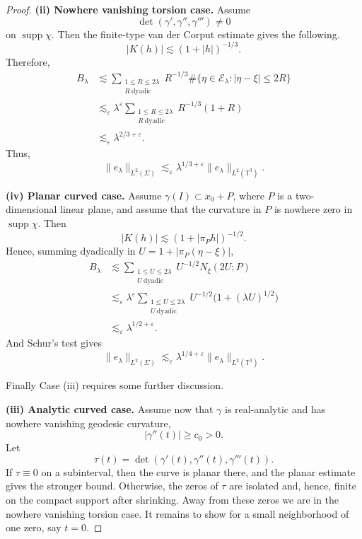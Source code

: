 \documentclass[11pt,reqno]{amsart}
\numberwithin{equation}{section}
\newcommand{\1}{\textbf{1}}
\begin{document}
\begin{proof}
		\noindent\textbf{(ii) Nowhere vanishing torsion case.}
		Assume
		\[
		\det(\gamma',\gamma'',\gamma''')\neq 0
		\]
		on \(\operatorname{supp}\chi\). Then the finite-type van der Corput estimate gives the following.
		\[
		|K(h)|\lesssim (1+|h|)^{-1/3}.
		\]
		Therefore,
		\[
		\begin{aligned}
			B_\lambda
			&\lesssim
			\sum_{\substack{1\le R\le 2\lambda\\ R\ \mathrm{dyadic}}}
			R^{-1/3}\#\{\eta\in\mathcal E_\lambda:|\eta-\xi|\le 2R\}  \\
			&\lesssim_\varepsilon
			\lambda^\varepsilon
			\sum_{\substack{1\le R\le 2\lambda\\ R\ \mathrm{dyadic}}}
			R^{-1/3}(1+R)                                             \\
			&\lesssim_\varepsilon \lambda^{2/3+\varepsilon}.
		\end{aligned}
		\]
		Thus,
		\[
		\|e_\lambda\|_{L^2(\Sigma)}
		\lesssim_\varepsilon
		\lambda^{1/3+\varepsilon}
		\|e_\lambda\|_{L^2(\mathbb T^3)} .
		\]
		
		\noindent\textbf{(iv) Planar curved case.}
		Assume \(\gamma(I)\subset x_0+P\), where \(P\) is a two-dimensional linear
		plane, and assume that the curvature in \(P\) is nowhere zero in
		\(\operatorname{supp}\chi\).  Then
		\[
		|K(h)|\lesssim (1+|\pi_P h|)^{-1/2}.
		\]
		Hence, summing dyadically in \(U=1+|\pi_P(\eta-\xi)|\),
		\[
		\begin{aligned}
			B_\lambda
			&\lesssim
			\sum_{\substack{1\le U\le 2\lambda\\ U\ \mathrm{dyadic}}}
			U^{-1/2}N_\xi(2U;P)                                      \\
			&\lesssim_\varepsilon
			\lambda^\varepsilon
			\sum_{\substack{1\le U\le 2\lambda\\ U\ \mathrm{dyadic}}}
			U^{-1/2}\bigl(1+(\lambda U)^{1/2}\bigr)                    \\
			&\lesssim_\varepsilon \lambda^{1/2+\varepsilon}.
		\end{aligned}
		\]
		And Schur's test gives
		\[
		\|e_\lambda\|_{L^2(\Sigma)}
		\lesssim_\varepsilon
		\lambda^{1/4+\varepsilon}
		\|e_\lambda\|_{L^2(\mathbb T^3)} .
		\]
		
		Finally Case (iii) requires some further discussion.
		
		\noindent\textbf{(iii) Analytic curved case.}
		Assume now that \(\gamma\) is real-analytic and has nowhere vanishing geodesic curvature,
		\[
		|\gamma''(t)|\ge c_0>0.
		\]
		Let
		\[
		\tau(t)=\det(\gamma'(t),\gamma''(t),\gamma'''(t)).
		\]
		If \(\tau\equiv0\) on a subinterval, then the curve is planar there, and the
		planar estimate gives the stronger bound. Otherwise, the zeros of \(\tau\)
		are isolated and, hence, finite on the compact support after shrinking.  Away
		from these zeros we are in the nowhere vanishing torsion case.  It remains to show for a small neighborhood of one zero, say \(t=0\).
		

\end{proof}
\end{document}
